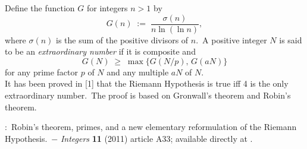 \documentclass[12pt]{article}
\theoremstyle{definition}
\begin{document}
Define the function $G$ for integers $n>1$ by
        $$G(n) \; :=\; \frac{\sigma(n)}{n\ln(\ln{n})},$$
where $\sigma(n)$ is the sum of the positive divisors of $n$.\, A positive integer $N$ is said to be an {\it extraordinary number} if it is composite and
          $$G(N) \;\ge\; \max\{G(N/p),\,G(aN)\}$$
for any prime factor $p$ of $N$ and any multiple $aN$ of $N$.\\

It has been proved in [1] that the Riemann Hypothesis is true iff 4 is the only extraordinary number.\, The proof is based on Gronwall's theorem and Robin's theorem.


\begin{thebibliography}{8}
:\, Robin's theorem, primes, and a new  elementary reformulation of the Riemann Hypothesis.\, $-$ \emph{Integers} \textbf{11} (2011) article A33;\; available directly at .
\end{thebibliography}

\end{document}
